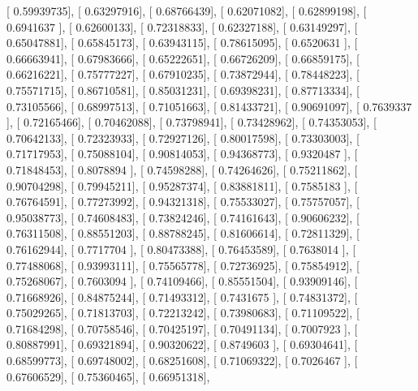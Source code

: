\documentclass{article}
\begin{document}
       [ 0.59939735],
       [ 0.63297916],
       [ 0.68766439],
       [ 0.62071082],
       [ 0.62899198],
       [ 0.6941637 ],
       [ 0.62600133],
       [ 0.72318833],
       [ 0.62327188],
       [ 0.63149297],
       [ 0.65047881],
       [ 0.65845173],
       [ 0.63943115],
       [ 0.78615095],
       [ 0.6520631 ],
       [ 0.66663941],
       [ 0.67983666],
       [ 0.65222651],
       [ 0.66726209],
       [ 0.66859175],
       [ 0.66216221],
       [ 0.75777227],
       [ 0.67910235],
       [ 0.73872944],
       [ 0.78448223],
       [ 0.75571715],
       [ 0.86710581],
       [ 0.85031231],
       [ 0.69398231],
       [ 0.87713334],
       [ 0.73105566],
       [ 0.68997513],
       [ 0.71051663],
       [ 0.81433721],
       [ 0.90691097],
       [ 0.7639337 ],
       [ 0.72165466],
       [ 0.70462088],
       [ 0.73798941],
       [ 0.73428962],
       [ 0.74353053],
       [ 0.70642133],
       [ 0.72323933],
       [ 0.72927126],
       [ 0.80017598],
       [ 0.73303003],
       [ 0.71717953],
       [ 0.75088104],
       [ 0.90814053],
       [ 0.94368773],
       [ 0.9320487 ],
       [ 0.71848453],
       [ 0.8078894 ],
       [ 0.74598288],
       [ 0.74264626],
       [ 0.75211862],
       [ 0.90704298],
       [ 0.79945211],
       [ 0.95287374],
       [ 0.83881811],
       [ 0.7585183 ],
       [ 0.76764591],
       [ 0.77273992],
       [ 0.94321318],
       [ 0.75533027],
       [ 0.75757057],
       [ 0.95038773],
       [ 0.74608483],
       [ 0.73824246],
       [ 0.74161643],
       [ 0.90606232],
       [ 0.76311508],
       [ 0.88551203],
       [ 0.88788245],
       [ 0.81606614],
       [ 0.72811329],
       [ 0.76162944],
       [ 0.7717704 ],
       [ 0.80473388],
       [ 0.76453589],
       [ 0.7638014 ],
       [ 0.77488068],
       [ 0.93993111],
       [ 0.75565778],
       [ 0.72736925],
       [ 0.75854912],
       [ 0.75268067],
       [ 0.7603094 ],
       [ 0.74109466],
       [ 0.85551504],
       [ 0.93909146],
       [ 0.71668926],
       [ 0.84875244],
       [ 0.71493312],
       [ 0.7431675 ],
       [ 0.74831372],
       [ 0.75029265],
       [ 0.71813703],
       [ 0.72213242],
       [ 0.73980683],
       [ 0.71109522],
       [ 0.71684298],
       [ 0.70758546],
       [ 0.70425197],
       [ 0.70491134],
       [ 0.7007923 ],
       [ 0.80887991],
       [ 0.69321894],
       [ 0.90320622],
       [ 0.8749603 ],
       [ 0.69304641],
       [ 0.68599773],
       [ 0.69748002],
       [ 0.68251608],
       [ 0.71069322],
       [ 0.7026467 ],
       [ 0.67606529],
       [ 0.75360465],
       [ 0.66951318],
\end{document}
